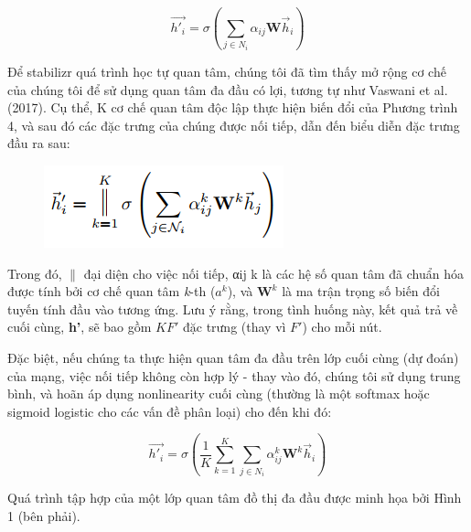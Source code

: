 \[\vec{h'_i} = \sigma ({\displaystyle \sum_{j \in N_i}} \alpha_{ij}\textbf{W}\vec{h}_i)\]

Để stabilizr quá trình học tự quan tâm, chúng tôi đã tìm thấy mở rộng cơ chế của chúng tôi để sử dụng quan tâm đa đầu có lợi, tương tự như Vaswani et al. (2017). Cụ thể, K cơ chế quan tâm độc lập thực hiện biến đổi của Phương trình 4, và sau đó các đặc trưng của chúng được nối tiếp, dẫn đến biểu diễn đặc trưng đầu ra sau:

\begin{figure}[h]
	\centering
	\includegraphics[scale = 0.7]{Chapter1/Figs/ct5.png}
	\label{fig:ct1}
\end{figure}

Trong đó, $\|$ đại diện cho việc nối tiếp, αij k là các hệ số quan tâm đã chuẩn hóa được tính bởi cơ chế quan tâm \textit{k}-th ($a^k$), và $\textbf{W}^k$ là ma trận trọng số biến đổi tuyến tính đầu vào tương ứng. Lưu ý rằng, trong tình huống này, kết quả trả về cuối cùng, \textbf{h'}, sẽ bao gồm $KF'$ đặc trưng (thay vì $F'$) cho mỗi nút.

Đặc biệt, nếu chúng ta thực hiện quan tâm đa đầu trên lớp cuối cùng (dự đoán) của mạng, việc nối tiếp không còn hợp lý - thay vào đó, chúng tôi sử dụng trung bình, và hoãn áp dụng nonlinearity cuối cùng (thường là một softmax hoặc sigmoid logistic cho các vấn đề phân loại) cho đến khi đó:

\[
\vec{h'_i} = \sigma (
\frac{1}{K}
{\displaystyle \sum_{k=1}^K}
{\displaystyle \sum_{j \in N_i}} 
\alpha_{ij}^k\textbf{W}^k\vec{h}_i)
\]

Quá trình tập hợp của một lớp quan tâm đồ thị đa đầu được minh họa bởi Hình 1 (bên phải).

